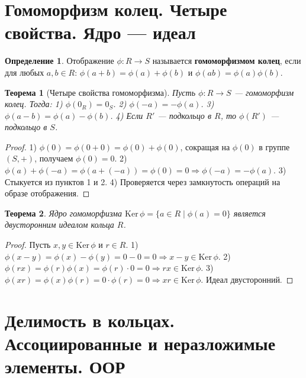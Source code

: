 \documentclass[12pt, a4paper]{article}
\newtheorem{theorem}{Теорема}
\theoremstyle{definition}
\newtheorem{definition}{Определение}
\theoremstyle{remark}
\newcommand{\Ker}{\mathrm{Ker}\,}
\begin{document}
\section{Гомоморфизм колец. Четыре свойства. Ядро — идеал}

\begin{definition}
	Отображение $\phi: R \to S$ называется \textbf{гомоморфизмом колец}, если для любых $a, b \in R$:
	$\phi(a+b) = \phi(a) + \phi(b)$ и $\phi(ab) = \phi(a)\phi(b)$.
\end{definition}

\begin{theorem}[Четыре свойства гомоморфизма]
	Пусть $\phi: R \to S$ — гомоморфизм колец. Тогда:
	1) $\phi(0_R) = 0_S$.
	2) $\phi(-a) = -\phi(a)$.
	3) $\phi(a-b) = \phi(a) - \phi(b)$.
	4) Если $R'$ — подкольцо в $R$, то $\phi(R')$ — подкольцо в $S$.
\end{theorem}
\begin{proof}
	1) $\phi(0) = \phi(0+0) = \phi(0) + \phi(0)$, сокращая на $\phi(0)$ в группе $(S, +)$, получаем $\phi(0) = 0$.
	2) $\phi(a) + \phi(-a) = \phi(a + (-a)) = \phi(0) = 0 \Rightarrow \phi(-a) = -\phi(a)$.
	3) Стыкуется из пунктов 1 и 2.
	4) Проверяется через замкнутость операций на образе отображения.
\end{proof}

\begin{theorem}
	Ядро гомоморфизма $\Ker\phi = \{a \in R \mid \phi(a) = 0\}$ является двусторонним идеалом кольца $R$.
\end{theorem}
\begin{proof}
	Пусть $x, y \in \Ker\phi$ и $r \in R$.
	1) $\phi(x-y) = \phi(x) - \phi(y) = 0 - 0 = 0 \Rightarrow x-y \in \Ker\phi$.
	2) $\phi(rx) = \phi(r)\phi(x) = \phi(r)\cdot 0 = 0 \Rightarrow rx \in \Ker\phi$.
	3) $\phi(xr) = \phi(x)\phi(r) = 0 \cdot \phi(r) = 0 \Rightarrow xr \in \Ker\phi$. Идеал двусторонний.
\end{proof}

\section{Делимость в кольцах. Ассоциированные и неразложимые элементы. ООР}
\end{document}

